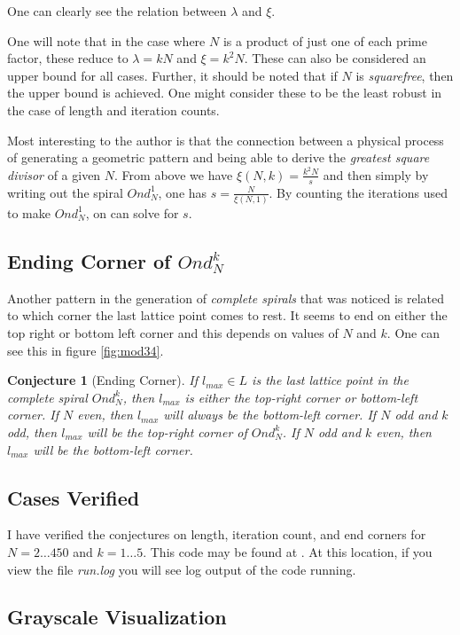 \documentclass[11pt]{amsart}
\theoremstyle{mydef}
\newtheorem{conj}{Conjecture}[section]
\begin{document}
One can clearly see the relation between $\lambda$ and $\xi$. 

One will note that in the case where $N$ is a product of just one of each prime factor, these reduce to $\lambda = kN$ and $\xi = k^2N$. These can also be considered an upper bound for all cases. Further, it should be noted that if $N$ is \textit{squarefree}, then the upper bound is achieved. One might consider these to be the least robust in the case of length and iteration counts.

Most interesting to the author is that the connection between a physical process of generating a geometric pattern and being able to derive the \textit{greatest square divisor} of a given $N$. From above we have $\xi(N, k) = \frac{k^2 N}{s}$ and then simply by writing out the spiral $Ond^1_N$, one has $s = \frac{N}{\xi(N,1)}$. By counting the iterations used to make $Ond^1_N$, on can solve for $s$.

\subsection{Ending Corner of $Ond^k_N$}

Another pattern in the generation of \textit{complete spirals} that was noticed is related to which corner the last lattice point comes to rest. It seems to end on either the top right or bottom left corner and this depends on values of $N$ and $k$. One can see this in figure \ref{fig:mod34}.

\begin{conj}[Ending Corner]
If $l_{max} \in L$ is the last lattice point in the complete spiral $Ond^k_N$, then $l_{max}$ is either the top-right corner or bottom-left corner. If $N$ even, then $l_{max}$ will always be the bottom-left corner. If $N$ odd and $k$ odd, then $l_{max}$ will be the top-right corner of $Ond^k_N$. If $N$ odd and $k$ even, then $l_{max}$ will be the bottom-left corner.
\end{conj}

\subsection{Cases Verified}
I have verified the conjectures on length, iteration count, and end corners for $N=2\ldots450$ and $k=1\ldots5$. This code may be found at \cite{PySquare}. At this location, if you view the file \textit{run.log} you will see log output of the code running.

\subsection{Grayscale Visualization}
\end{document}
